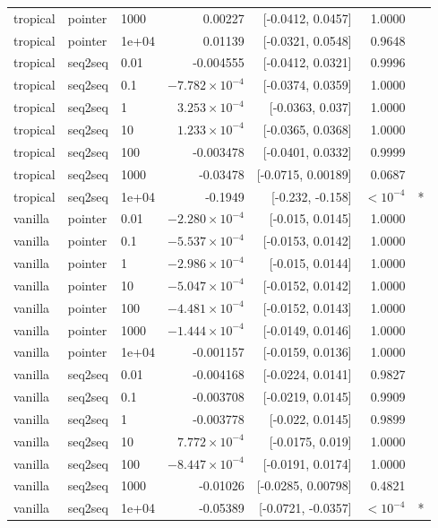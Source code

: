 \documentclass[10pt]{article}
\begin{document}
{\begin{longtable}{lllrrrl}
tropical & pointer & 1000 & 0.00227 & [-0.0412, 0.0457] & 1.0000 & \\
tropical & pointer & 1e+04 & 0.01139 & [-0.0321, 0.0548] & 0.9648 & \\
tropical & seq2seq & 0.01 & -0.004555 & [-0.0412, 0.0321] & 0.9996 & \\
tropical & seq2seq & 0.1 & $-7.782\times10^{-4}$ & [-0.0374, 0.0359] & 1.0000 & \\
tropical & seq2seq & 1 & $3.253\times10^{-4}$ & [-0.0363, 0.037] & 1.0000 & \\
tropical & seq2seq & 10 & $1.233\times10^{-4}$ & [-0.0365, 0.0368] & 1.0000 & \\
tropical & seq2seq & 100 & -0.003478 & [-0.0401, 0.0332] & 0.9999 & \\
tropical & seq2seq & 1000 & -0.03478 & [-0.0715, 0.00189] & 0.0687 & \\
tropical & seq2seq & 1e+04 & -0.1949 & [-0.232, -0.158] & $<10^{-4}$ & *\\
vanilla & pointer & 0.01 & $-2.280\times10^{-4}$ & [-0.015, 0.0145] & 1.0000 & \\
vanilla & pointer & 0.1 & $-5.537\times10^{-4}$ & [-0.0153, 0.0142] & 1.0000 & \\
vanilla & pointer & 1 & $-2.986\times10^{-4}$ & [-0.015, 0.0144] & 1.0000 & \\
vanilla & pointer & 10 & $-5.047\times10^{-4}$ & [-0.0152, 0.0142] & 1.0000 & \\
vanilla & pointer & 100 & $-4.481\times10^{-4}$ & [-0.0152, 0.0143] & 1.0000 & \\
vanilla & pointer & 1000 & $-1.444\times10^{-4}$ & [-0.0149, 0.0146] & 1.0000 & \\
vanilla & pointer & 1e+04 & -0.001157 & [-0.0159, 0.0136] & 1.0000 & \\
vanilla & seq2seq & 0.01 & -0.004168 & [-0.0224, 0.0141] & 0.9827 & \\
vanilla & seq2seq & 0.1 & -0.003708 & [-0.0219, 0.0145] & 0.9909 & \\
vanilla & seq2seq & 1 & -0.003778 & [-0.022, 0.0145] & 0.9899 & \\
vanilla & seq2seq & 10 & $7.772\times10^{-4}$ & [-0.0175, 0.019] & 1.0000 & \\
vanilla & seq2seq & 100 & $-8.447\times10^{-4}$ & [-0.0191, 0.0174] & 1.0000 & \\
vanilla & seq2seq & 1000 & -0.01026 & [-0.0285, 0.00798] & 0.4821 & \\
vanilla & seq2seq & 1e+04 & -0.05389 & [-0.0721, -0.0357] & $<10^{-4}$ & *\\
\bottomrule
\end{longtable}
}
\end{document}
